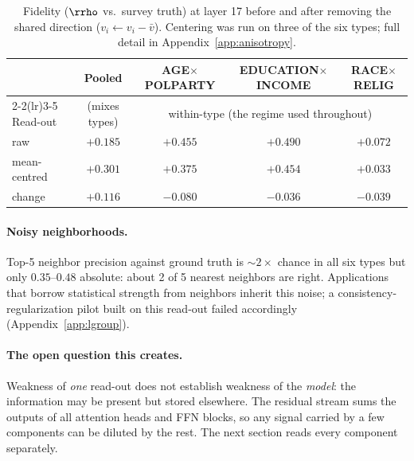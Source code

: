 \begin{table}[h]
\centering\small
\caption{Fidelity ($\rrho$ vs.\ survey truth) at layer 17 before and
after removing the shared direction ($v_i \leftarrow v_i - \bar{v}$).
Centering was run on three of the six types; full detail in
Appendix~\ref{app:anisotropy}.}
\label{tab:centering}
\begin{tabular}{lcccc}
\toprule
& Pooled & AGE$\times$POLPARTY & EDUCATION$\times$INCOME & RACE$\times$RELIG\\
\cmidrule(lr){2-2}\cmidrule(lr){3-5}
Read-out & \multicolumn{1}{c}{(mixes types)} & \multicolumn{3}{c}{within-type (the regime used throughout)}\\
\midrule
raw            & $+0.185$ & $+0.455$ & $+0.490$ & $+0.072$ \\
mean-centred   & $+0.301$ & $+0.375$ & $+0.454$ & $+0.033$ \\
\midrule
change & $\mathbf{+0.116}$ & $-0.080$ & $-0.036$ & $-0.039$ \\
\bottomrule
\end{tabular}
\end{table}

\paragraph{Noisy neighborhoods.}
Top-5 neighbor precision against ground truth is ${\sim}2\times$ chance in
all six types but only $0.35$--$0.48$ absolute: about 2 of 5 nearest
neighbors are right. %
Applications that borrow statistical strength from neighbors inherit this
noise; a consistency-regularization pilot built on this read-out failed
accordingly (Appendix~\ref{app:lgroup}).

\paragraph{The open question this creates.}
Weakness of \emph{one} read-out does not establish weakness of the
\emph{model}: the information may be present but stored elsewhere. The
residual stream sums the outputs of all attention heads and FFN blocks,
so any signal carried by a few components can be diluted by the rest.
The next section reads every component separately.
